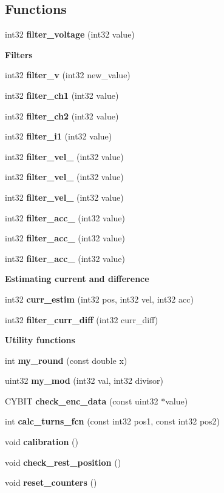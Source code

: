 \subsection*{Functions}
\begin{DoxyCompactItemize}
\item 
int32 \textbf{ filter\+\_\+voltage} (int32 value)
\end{DoxyCompactItemize}
\begin{Indent}\textbf{ Filters}\par
\begin{DoxyCompactItemize}
\item 
int32 \textbf{ filter\+\_\+v} (int32 new\+\_\+value)
\item 
int32 \textbf{ filter\+\_\+ch1} (int32 value)
\item 
int32 \textbf{ filter\+\_\+ch2} (int32 value)
\item 
int32 \textbf{ filter\+\_\+i1} (int32 value)
\item 
int32 \textbf{ filter\+\_\+vel\+\_} (int32 value)
\item 
int32 \textbf{ filter\+\_\+vel\+\_} (int32 value)
\item 
int32 \textbf{ filter\+\_\+vel\+\_} (int32 value)
\item 
int32 \textbf{ filter\+\_\+acc\+\_} (int32 value)
\item 
int32 \textbf{ filter\+\_\+acc\+\_} (int32 value)
\item 
int32 \textbf{ filter\+\_\+acc\+\_} (int32 value)
\end{DoxyCompactItemize}
\end{Indent}
\begin{Indent}\textbf{ Estimating current and difference}\par
\begin{DoxyCompactItemize}
\item 
int32 \textbf{ curr\+\_\+estim} (int32 pos, int32 vel, int32 acc)
\item 
int32 \textbf{ filter\+\_\+curr\+\_\+diff} (int32 curr\+\_\+diff)
\end{DoxyCompactItemize}
\end{Indent}
\begin{Indent}\textbf{ Utility functions}\par
\begin{DoxyCompactItemize}
\item 
int \textbf{ my\+\_\+round} (const double x)
\item 
uint32 \textbf{ my\+\_\+mod} (int32 val, int32 divisor)
\item 
C\+Y\+B\+IT \textbf{ check\+\_\+enc\+\_\+data} (const uint32 $\ast$value)
\item 
int \textbf{ calc\+\_\+turns\+\_\+fcn} (const int32 pos1, const int32 pos2)
\item 
void \textbf{ calibration} ()
\item 
void \textbf{ check\+\_\+rest\+\_\+position} ()
\item 
void \textbf{ reset\+\_\+counters} ()
\end{DoxyCompactItemize}
\end{Indent}


